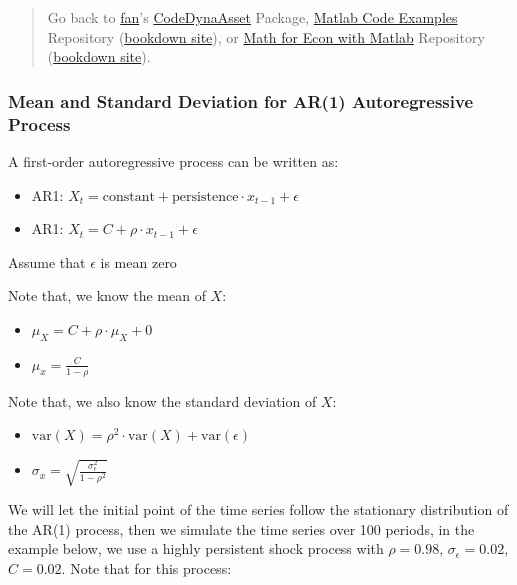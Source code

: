\documentclass[
]{book}
\begin{document}
\begin{quote}
Go back to \href{http://fanwangecon.github.io/}{fan}'s \href{https://fanwangecon.github.io/CodeDynaAsset/}{CodeDynaAsset} Package, \href{https://fanwangecon.github.io/M4Econ/}{Matlab Code Examples} Repository (\href{https://fanwangecon.github.io/M4Econ/bookdown}{bookdown site}), or \href{https://fanwangecon.github.io/Math4Econ/}{Math for Econ with Matlab} Repository (\href{https://fanwangecon.github.io/Math4Econ/bookdown}{bookdown site}).
\end{quote}

\hypertarget{mean-and-standard-deviation-for-ar1-autoregressive-process}{%
\subsubsection{Mean and Standard Deviation for AR(1) Autoregressive Process}\label{mean-and-standard-deviation-for-ar1-autoregressive-process}}

A first-order autoregressive process can be written as:

\begin{itemize}
\item
  AR1:
  \(X_t =\textrm{constant}+\textrm{persistence}\cdot x_{t-1} +\epsilon\)
\item
  AR1: \(X_t =C+\rho \cdot x_{t-1} +\epsilon\)
\end{itemize}

Assume that \(\epsilon\) is mean zero

Note that, we know the mean of \(X\):

\begin{itemize}
\item
  \(\displaystyle \mu_X =C+\rho \cdot \mu_X +0\)
\item
  \(\displaystyle \mu_x =\frac{C}{1-\rho }\)
\end{itemize}

Note that, we also know the standard deviation of \(X\):

\begin{itemize}
\item
  \(\displaystyle \textrm{var}\left(X\right)=\rho^2 \cdot \textrm{var}\left(X\right)+\textrm{var}\left(\epsilon \right)\)
\item
  \(\displaystyle \sigma_x =\sqrt{\frac{\sigma_{\epsilon }^2 }{1-\rho^2 }}\)
\end{itemize}

We will let the initial point of the time series follow the stationary
distribution of the AR(1) process, then we simulate the time series over
100 periods, in the example below, we use a highly persistent shock
process with \(\rho =0.98\), \(\sigma_{\epsilon } =0.02\), \(C=0.02\). Note
that for this process:
\end{document}
